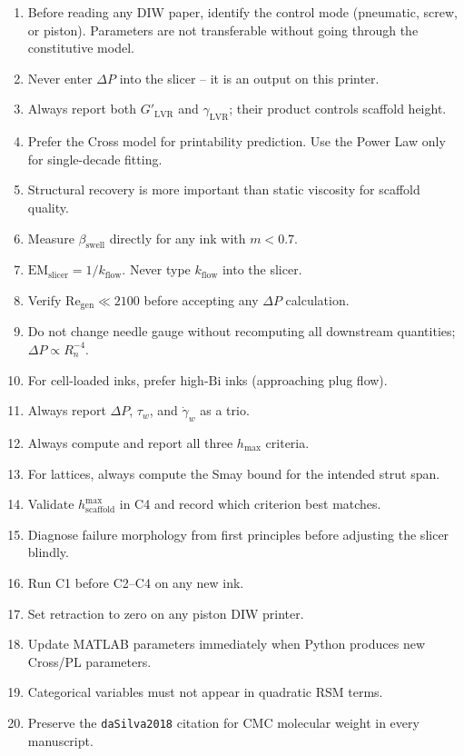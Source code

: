 \documentclass[11pt,a4paper]{article}
\newcommand{\gd}{\dot{\gamma}}
\newcommand{\Bi}{\mathrm{Bi}}
\newcommand{\Rey}{\mathrm{Re}}
\begin{document}
\begin{enumerate}[label=\textbf{DR \arabic*.},leftmargin=2.8em,itemsep=4pt]
\item Before reading any DIW paper, identify the control mode (pneumatic,
  screw, or piston). Parameters are not transferable without going
  through the constitutive model.
\item Never enter $\Delta P$ into the slicer -- it is an output on this
  printer.
\item Always report both $G'_\mathrm{LVR}$ and $\gamma_\mathrm{LVR}$;
  their product controls scaffold height.
\item Prefer the Cross model for printability prediction. Use the Power
  Law only for single-decade fitting.
\item Structural recovery is more important than static viscosity for
  scaffold quality.
\item Measure $\beta_\mathrm{swell}$ directly for any ink with $m<0.7$.
\item $\mathrm{EM}_\mathrm{slicer}=1/k_\mathrm{flow}$. Never type
  $k_\mathrm{flow}$ into the slicer.
\item Verify $\Rey_\mathrm{gen}\ll 2100$ before accepting any $\Delta P$
  calculation.
\item Do not change needle gauge without recomputing all downstream
  quantities; $\Delta P\propto R_n^{-4}$.
\item For cell-loaded inks, prefer high-$\Bi$ inks (approaching plug
  flow).
\item Always report $\Delta P$, $\tau_w$, and $\gd_w$ as a trio.
\item Always compute and report all three $h_\mathrm{max}$ criteria.
\item For lattices, always compute the Smay bound for the intended strut
  span.
\item Validate $h_\mathrm{scaffold}^{\max}$ in C4 and record which
  criterion best matches.
\item Diagnose failure morphology from first principles before adjusting
  the slicer blindly.
\item Run C1 before C2--C4 on any new ink.
\item Set retraction to zero on any piston DIW printer.
\item Update MATLAB parameters immediately when Python produces new
  Cross/PL parameters.
\item Categorical variables must not appear in quadratic RSM terms.
\item Preserve the \texttt{daSilva2018} citation for CMC molecular weight
  in every manuscript.
\end{enumerate}
\end{document}
